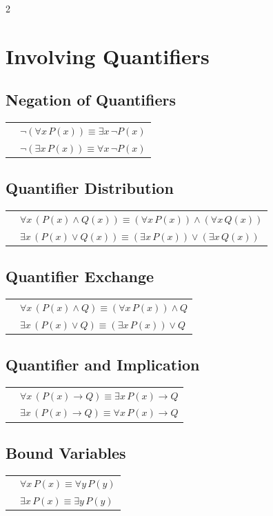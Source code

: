 \documentclass{article}
\begin{document}
\begin{multicols}{2}
\section{Involving Quantifiers}
\subsection*{Negation of Quantifiers}
\begin{tabular}{l l}
& $\neg (\forall x \, P(x)) \equiv \exists x \, \neg P(x)$ \\
& $\neg (\exists x \, P(x)) \equiv \forall x \, \neg P(x)$ \\
\end{tabular}

\subsection*{Quantifier Distribution}
\begin{tabular}{l l}
& $\forall x \, (P(x) \land Q(x)) \equiv (\forall x \, P(x)) \land (\forall x \, Q(x))$ \\
& $\exists x \, (P(x) \lor Q(x)) \equiv (\exists x \, P(x)) \lor (\exists x \, Q(x))$ \\
\end{tabular}

\subsection*{Quantifier Exchange}
\begin{tabular}{l l}
& $\forall x \, (P(x) \land Q) \equiv (\forall x \, P(x)) \land Q$ \\
& $\exists x \, (P(x) \lor Q) \equiv (\exists x \, P(x)) \lor Q$
\end{tabular}

\subsection*{Quantifier and Implication}
\begin{tabular}{l l}
& $\forall x \, (P(x) \rightarrow Q) \equiv \exists x \, P(x) \rightarrow Q$ \\
& $\exists x \, (P(x) \rightarrow Q) \equiv \forall x \, P(x) \rightarrow Q$
\end{tabular}

\subsection*{Bound Variables}
\begin{tabular}{l l}
& $\forall x \, P(x) \equiv \forall y \, P(y)$ \\
& $\exists x \, P(x) \equiv \exists y \, P(y)$ \\
\end{tabular}
\end{multicols}    
\end{document}
